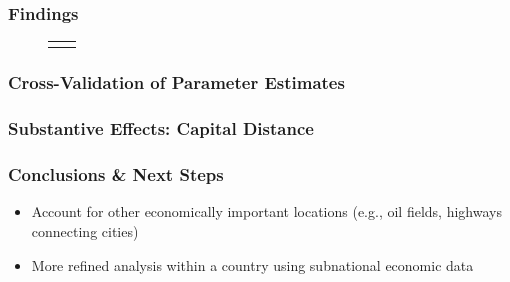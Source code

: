 \begin{frame}
\frametitle{Findings}

\vspace{-8mm}
\begin{figure}
	\centering
	\begin{tabular}{cc}
	\hspace{-9mm}
		\resizebox{.5\textwidth}{!}{} &
		\resizebox{.5\textwidth}{!}{}
	\end{tabular}
\end{figure}

\end{frame}

\begin{frame}
\frametitle{Cross-Validation of Parameter Estimates}

\begin{figure}[ht]
	\centering
	\resizebox{1\textwidth}{!}{}
\end{figure}

\end{frame}

\begin{frame}
\frametitle{Substantive Effects: Capital Distance}

\vspace{-6mm}
\begin{figure}
	\centering
	\resizebox{1\textwidth}{!}{}
\end{figure}

\end{frame}

\begin{frame}
\frametitle{Conclusions \& Next Steps}

\begin{itemize}
\item Account for other economically important locations (e.g., oil fields, highways connecting cities)
\item More refined analysis within a country using subnational economic data
\end{itemize}

\end{frame}
